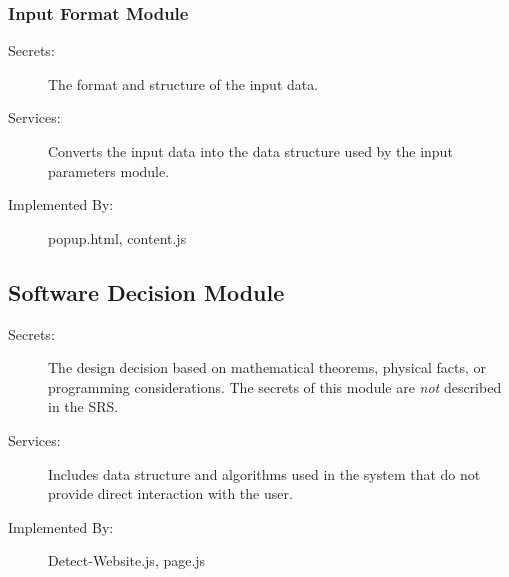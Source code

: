 \documentclass[12pt, titlepage]{article}
\begin{document}
\subsubsection{Input Format Module} %
\begin{description}
\item[Secrets:]The format and structure of the input data.
\item[Services:]Converts the input data into the data structure used by the
  input parameters module.
\item[Implemented By:] popup.html, content.js
\end{description}
\subsection{Software Decision Module}
\begin{description}
\item[Secrets:] The design decision based on mathematical theorems, physical
  facts, or programming considerations. The secrets of this module are
  \emph{not} described in the SRS.
\item[Services:] Includes data structure and algorithms used in the system that
  do not provide direct interaction with the user. 
\item[Implemented By:] Detect-Website.js, page.js
\end{description}
\end{document}
